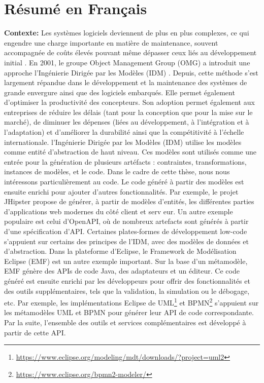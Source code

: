 \chapter{Résumé en Français}
\textbf{Contexte:} Les systèmes logiciels deviennent de plus en plus complexes, ce qui engendre une charge importante en matière de maintenance, souvent accompagnée de coûts élevés pouvant même dépasser ceux liés au développement initial \cite{https://doi.org/10.1049/sfw2.12075}.
 En 2001, le groupe Object Management Group (OMG) a introduit une approche l’Ingénierie Dirigée par les Modèles (IDM) \cite{brambilla2017model}. Depuis, cette méthode s’est largement répandue dans le développement et la maintenance des systèmes de grande envergure ainsi que des logiciels embarqués. Elle permet également d’optimiser la productivité des concepteurs.
 Son adoption permet également aux entreprises de réduire les délais (tant pour la conception que pour la mise sur le marché), de diminuer les dépenses (liées au développement, à l’intégration et à l’adaptation) et d’améliorer la durabilité ainsi que la compétitivité à l’échelle internationale.
l’Ingénierie Dirigée par les Modèles (IDM) utilise les modèles comme entité d'abstraction de haut niveau. Ces modèles sont utilisés comme une entrée pour la génération de plusieurs artéfacts : contraintes, transformations, instances de modèles, et le code. Dans le cadre de cette thèse, nous nous intéressons particulièrement au code. 
Le code généré à partir des modèles est ensuite enrichi pour ajouter d'autres fonctionnalités. Par exemple, le projet JHipster propose de générer, à partir de modèles d'entités, les différentes parties d'applications web modernes du côté client et serv eur. Un autre exemple populaire est celui d'OpenAPI, où de nombreux artefacts sont générés à partir d'une spécification d'API. Certaines plates-formes de développement low-code s'appuient sur certains des principes de l'IDM, avec des modèles de données et d'abstraction. Dans la plateforme d’Eclipse, le Framework de Modélisation Eclipse (EMF) est un autre exemple important. Sur la base d'un métamodèle, EMF génère des APIs de code Java, des adaptateurs et un éditeur. Ce code généré est ensuite enrichi par les développeurs pour offrir des fonctionnalités et des outils supplémentaires, tels que la validation, la simulation ou le débogage, etc. Par exemple, les implémentations Eclipse de UML\footnote{\url{https://www.eclipse.org/modeling/mdt/downloads/?project=uml2}} et BPMN\footnote{\url{https://www.eclipse.org/bpmn2-modeler/}} s’appuient sur les métamodèles UML et BPMN pour générer leur API de code correspondante. Par la suite, l’ensemble des outils et services complémentaires est développé à partir de cette API.

